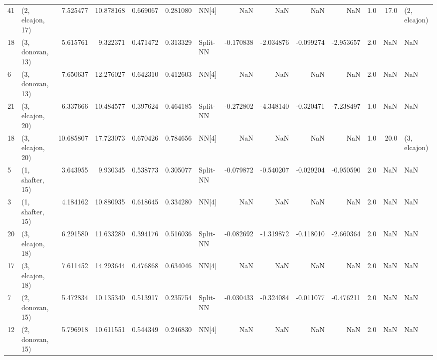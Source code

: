 \begin{tabular}{llrrrrlrrrrrrl}
41 &  (2, elcajon, 17) &   7.525477 &  10.878168 &   0.669067 &  0.281080 &       NN[4] &             NaN &           NaN &            NaN &          NaN &            1.0 &   17.0 &     (2, elcajon) \\
18 &  (3, donovan, 13) &   5.615761 &   9.322371 &   0.471472 &  0.313329 &    Split-NN &       -0.170838 &     -2.034876 &      -0.099274 &    -2.953657 &            2.0 &    NaN &              NaN \\
6  &  (3, donovan, 13) &   7.650637 &  12.276027 &   0.642310 &  0.412603 &       NN[4] &             NaN &           NaN &            NaN &          NaN &            2.0 &    NaN &              NaN \\
21 &  (3, elcajon, 20) &   6.337666 &  10.484577 &   0.397624 &  0.464185 &    Split-NN &       -0.272802 &     -4.348140 &      -0.320471 &    -7.238497 &            1.0 &    NaN &              NaN \\
18 &  (3, elcajon, 20) &  10.685807 &  17.723073 &   0.670426 &  0.784656 &       NN[4] &             NaN &           NaN &            NaN &          NaN &            1.0 &   20.0 &     (3, elcajon) \\
5  &  (1, shafter, 15) &   3.643955 &   9.930345 &   0.538773 &  0.305077 &    Split-NN &       -0.079872 &     -0.540207 &      -0.029204 &    -0.950590 &            2.0 &    NaN &              NaN \\
3  &  (1, shafter, 15) &   4.184162 &  10.880935 &   0.618645 &  0.334280 &       NN[4] &             NaN &           NaN &            NaN &          NaN &            2.0 &    NaN &              NaN \\
20 &  (3, elcajon, 18) &   6.291580 &  11.633280 &   0.394176 &  0.516036 &    Split-NN &       -0.082692 &     -1.319872 &      -0.118010 &    -2.660364 &            2.0 &    NaN &              NaN \\
17 &  (3, elcajon, 18) &   7.611452 &  14.293644 &   0.476868 &  0.634046 &       NN[4] &             NaN &           NaN &            NaN &          NaN &            2.0 &    NaN &              NaN \\
7  &  (2, donovan, 15) &   5.472834 &  10.135340 &   0.513917 &  0.235754 &    Split-NN &       -0.030433 &     -0.324084 &      -0.011077 &    -0.476211 &            2.0 &    NaN &              NaN \\
12 &  (2, donovan, 15) &   5.796918 &  10.611551 &   0.544349 &  0.246830 &       NN[4] &             NaN &           NaN &            NaN &          NaN &            2.0 &    NaN &              NaN \\

\end{tabular}
